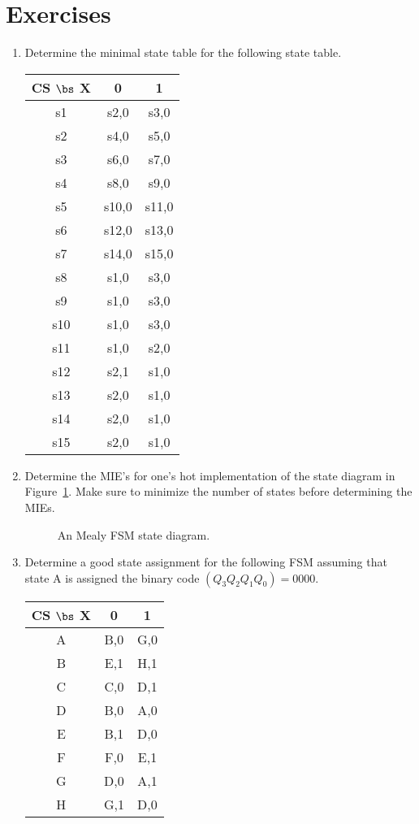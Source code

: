 \section{Exercises}
\begin{enumerate}

\item Determine the minimal state table for the following
state table.

\begin{tabular}{c||c|c}
CS $\bs$ X &  0     &  1 \\ \hline \hline
s1  &  s2,0  &  s3,0 \\ \hline
s2  &  s4,0  &  s5,0 \\ \hline
s3  &  s6,0  &  s7,0 \\ \hline
s4  &  s8,0  &  s9,0 \\ \hline
s5  &  s10,0 &  s11,0 \\ \hline
s6  &  s12,0 &  s13,0 \\ \hline
s7  &  s14,0 &  s15,0 \\ \hline
s8  &  s1,0  &  s3,0 \\ \hline
s9  &  s1,0  &  s3,0 \\ \hline
s10 &  s1,0  &  s3,0 \\ \hline
s11 &  s1,0  &  s2,0 \\ \hline
s12 &  s2,1  &  s1,0 \\ \hline
s13 &  s2,0  &  s1,0 \\ \hline
s14 &  s2,0  &  s1,0 \\ \hline
s15 &  s2,0  &  s1,0 \\ 
\end{tabular}


\item Determine the MIE's for one's hot implementation of the state
diagram in Figure~\ref{fig:MinState}.  Make sure to minimize the 
number of states before determining the MIEs.
\begin{figure}[ht]
\caption{An Mealy FSM state diagram.}
\label{fig:MinState}
\end{figure}

\item Determine a good state assignment for the following FSM assuming
that state A is assigned the binary code $(Q_3 Q_2 Q_1 Q_0) = 0000$.

\begin{tabular}{c||c|c}
CS $\bs$ X&  0    &  1 \\ \hline \hline
A   &  B,0  &  G,0 \\ \hline
B   &  E,1  &  H,1 \\ \hline
C   &  C,0  &  D,1 \\ \hline
D   &  B,0  &  A,0 \\ \hline
E   &  B,1  &  D,0 \\ \hline
F   &  F,0  &  E,1 \\ \hline
G   &  D,0  &  A,1 \\ \hline
H   &  G,1  &  D,0 \\ 
\end{tabular}



\end{enumerate}
